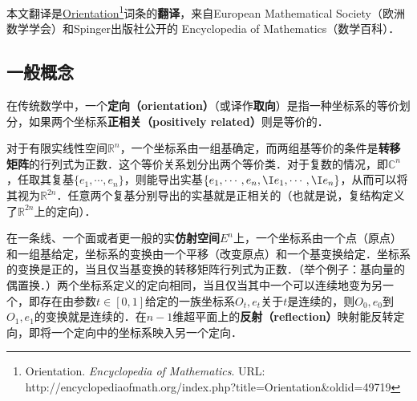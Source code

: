 
本文翻译是\href{https://encyclopediaofmath.org/wiki/Orientation}{Orientation}\footnote{Orientation. \textsl{Encyclopedia of Mathematics}. URL: http://encyclopediaofmath.org/index.php?title=Orientation&oldid=49719}词条的\textbf{翻译}，来自European Mathematical Society（欧洲数学学会）和Spinger出版社公开的 Encyclopedia of Mathematics（数学百科）．



\subsection{一般概念}

在传统数学中，一个\textbf{定向（orientation）}（或译作\textbf{取向}）是指一种坐标系的等价划分，如果两个坐标系\textbf{正相关（positively related）}则是等价的．


对于有限实线性空间$\mathbb{R}^n$，一个坐标系由一组基确定，而两组基等价的条件是\textbf{转移矩阵}的行列式为正数．这个等价关系划分出两个等价类．对于复数的情况，即$\mathbb{C}^n$，任取其复基$\{e_1, \cdots, e_n\}$，则能导出实基$\{e_1, \cdots, e_n, \I e_1, \cdots, \I e_n\}$，从而可以将其视为$\mathbb{R}^{2n}$．任意两个复基分别导出的实基就是正相关的（也就是说，复结构定义了$\mathbb{R}^{2n}$上的定向）．


在一条线、一个面或者更一般的实\textbf{仿射空间}$E^n$上，一个坐标系由一个点（原点）和一组基给定，坐标系的变换由一个平移（改变原点）和一个基变换给定．坐标系的变换是正的，当且仅当基变换的转移矩阵行列式为正数．（举个例子：基向量的偶置换．）两个坐标系定义的定向相同，当且仅当其中一个可以连续地变为另一个，即存在由参数$t\in[0, 1]$给定的一族坐标系$O_t, e_t$关于$t$是连续的，则$O_0, e_0$到$O_1, e_1$的变换就是连续的．在$n-1$维超平面上的\textbf{反射（reflection）}映射能反转定向，即将一个定向中的坐标系映入另一个定向．



